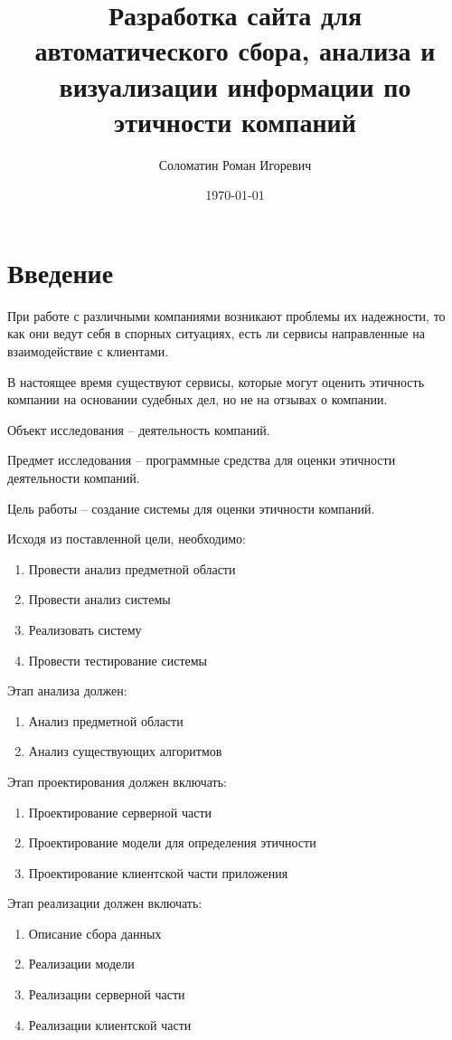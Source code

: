 \documentclass[PI, VKR]{HSEUniversity}
\author{Соломатин Роман Игоревич}
\date{\today}
\title{Разработка сайта для автоматического сбора, анализа и визуализации информации по этичности компаний}
\begin{document}
\maketitle

\chapter*{Введение}
\label{sec:org89a9856}
При работе с различными компаниями возникают проблемы их надежности, то как они ведут себя в спорных ситуациях, есть ли сервисы направленные на взаимодействие с клиентами.

В настоящее время существуют сервисы, которые могут оценить этичность компании на основании судебных дел, но не на отзывах о компании.

Объект исследования – деятельность компаний.

Предмет исследования – программные средства для оценки этичности деятельности компаний.

Цель работы – создание системы для оценки этичности компаний.

Исходя из поставленной цели, необходимо:

\begin{enumerate}
\item Провести анализ предметной области
\item Провести анализ системы
\item Реализовать систему
\item Провести тестирование системы
\end{enumerate}

Этап анализа должен:
\begin{enumerate}
\item Анализ предметной области
\item Анализ существующих алгоритмов
\end{enumerate}

Этап проектирования должен включать:
\begin{enumerate}
\item Проектирование серверной части
\item Проектирование модели для определения этичности
\item Проектирование клиентской части приложения
\end{enumerate}

Этап реализации должен включать:
\begin{enumerate}
\item Описание сбора данных
\item Реализации модели
\item Реализации серверной части
\item Реализации клиентской части
\end{enumerate}
\end{document}
